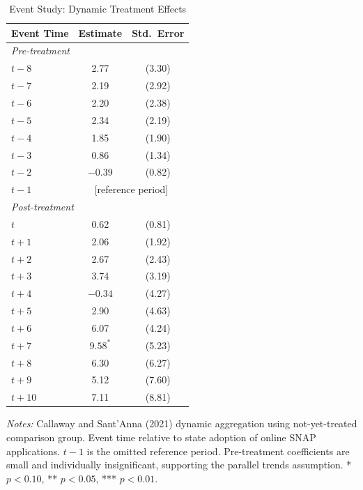 \begin{table}[H]
\centering
\caption{Event Study: Dynamic Treatment Effects}
\label{tab:eventstudy}
\begin{threeparttable}
\begin{tabular}{lcc}
\toprule
Event Time & Estimate & Std.\ Error \\
\midrule
\multicolumn{3}{l}{\textit{Pre-treatment}} \\
$t - 8$ & 2.77 & (3.30) \\
$t - 7$ & 2.19 & (2.92) \\
$t - 6$ & 2.20 & (2.38) \\
$t - 5$ & 2.34 & (2.19) \\
$t - 4$ & 1.85 & (1.90) \\
$t - 3$ & 0.86 & (1.34) \\
$t - 2$ & $-0.39$ & (0.82) \\
$t - 1$ & \multicolumn{2}{c}{[reference period]} \\
\midrule
\multicolumn{3}{l}{\textit{Post-treatment}} \\
$t$ & 0.62 & (0.81) \\
$t + 1$ & 2.06 & (1.92) \\
$t + 2$ & 2.67 & (2.43) \\
$t + 3$ & 3.74 & (3.19) \\
$t + 4$ & $-0.34$ & (4.27) \\
$t + 5$ & 2.90 & (4.63) \\
$t + 6$ & 6.07 & (4.24) \\
$t + 7$ & $9.58^{*}$ & (5.23) \\
$t + 8$ & 6.30 & (6.27) \\
$t + 9$ & 5.12 & (7.60) \\
$t + 10$ & 7.11 & (8.81) \\
\bottomrule
\end{tabular}
\begin{tablenotes}[flushleft]
\small
\item \textit{Notes:} Callaway and Sant'Anna (2021) dynamic aggregation using not-yet-treated comparison group. Event time relative to state adoption of online SNAP applications. $t-1$ is the omitted reference period. Pre-treatment coefficients are small and individually insignificant, supporting the parallel trends assumption. * $p<0.10$, ** $p<0.05$, *** $p<0.01$.
\end{tablenotes}
\end{threeparttable}
\end{table}
